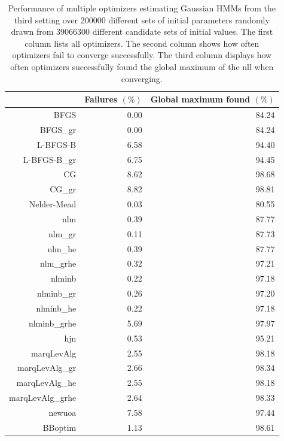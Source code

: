 \documentclass[]{interact}\usepackage[]{graphicx}\usepackage[dvipsnames]{xcolor}
\theoremstyle{plain}%
\theoremstyle{definition}
\theoremstyle{remark}
\begin{document}
\begin{table}[ht]
\centering
\caption{Performance of multiple optimizers estimating Gaussian HMMs from the third setting over 200000 different sets of initial parameters randomly drawn from 39066300 different candidate sets of initial values. The first column lists all optimizers. The second column shows how often optimizers fail to converge successfully. The third column displays how often optimizers successfully found the global maximum of the nll when converging.} 
\label{tab:performance-rates-simu3}
\begin{tabular}{rrr}
  \hline
 & Failures $(\%)$ & Global maximum found $(\%)$ \\ 
  \hline
BFGS & 0.00 & 84.24 \\ 
  BFGS\_gr & 0.00 & 84.24 \\ 
  L-BFGS-B & 6.58 & 94.40 \\ 
  L-BFGS-B\_gr & 6.75 & 94.45 \\ 
  CG & 8.62 & 98.68 \\ 
  CG\_gr & 8.82 & 98.81 \\ 
  Nelder-Mead & 0.03 & 80.55 \\ 
  nlm & 0.39 & 87.77 \\ 
  nlm\_gr & 0.11 & 87.73 \\ 
  nlm\_he & 0.39 & 87.77 \\ 
  nlm\_grhe & 0.32 & 97.21 \\ 
  nlminb & 0.22 & 97.18 \\ 
  nlminb\_gr & 0.26 & 97.20 \\ 
  nlminb\_he & 0.22 & 97.18 \\ 
  nlminb\_grhe & 5.69 & 97.97 \\ 
  hjn & 0.53 & 95.21 \\ 
  marqLevAlg & 2.55 & 98.18 \\ 
  marqLevAlg\_gr & 2.66 & 98.34 \\ 
  marqLevAlg\_he & 2.55 & 98.18 \\ 
  marqLevAlg\_grhe & 2.64 & 98.33 \\ 
  newuoa & 7.58 & 97.44 \\ 
  BBoptim & 1.13 & 98.61 \\ 
   \hline
\end{tabular}
\end{table}


\clearpage

\end{document}
